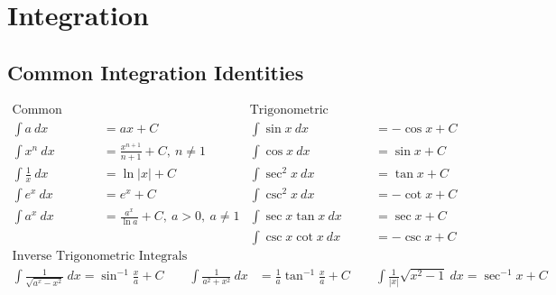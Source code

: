 \section{Integration}

\subsection*{Common Integration Identities}
\begin{align*}
  \text{Common Integrals} &                                          & \text{Trigonometric Integrals}                 \\
  \int a ~dx              & = ax + C                                 & \int \sin x ~dx                & = -\cos x + C \\
  \int x^n ~dx            & = \frac{x^{n+1}}{n+1} + C,~n \neq 1      & \int \cos x ~dx                & = \sin x + C  \\
  \int \frac{1}{x} ~dx    & = \ln \left\lvert x\right\rvert + C      & \int \sec^2 x ~dx              & = \tan x + C  \\
  \int e^x ~dx            & = e^x + C                                & \int \csc^2 x ~dx              & = -\cot x + C \\
  \int a^x ~dx            & = \frac{a^x}{\ln a} + C,~a > 0,~a \neq 1 & \int \sec x \tan x ~dx         & = \sec x + C  \\
                          &                                          & \int \csc x \cot x ~dx         & = -\csc x + C
\end{align*}
\begin{align*}
  \text{Inverse Trigonometric Integrals}                                                                                                                                                                                      \\
  \int \frac{1}{\sqrt{a^x-x^2}} ~dx = \sin^{-1} \frac{x}{a} + C \qquad \int \frac{1}{a^2+x^2} ~dx & = \frac{1}{a}\tan^{-1} \frac{x}{a} + C \qquad \int \frac{1}{\left\lvert x\right\rvert } \sqrt{x^2-1} ~dx = \sec^{-1}x + C
\end{align*}